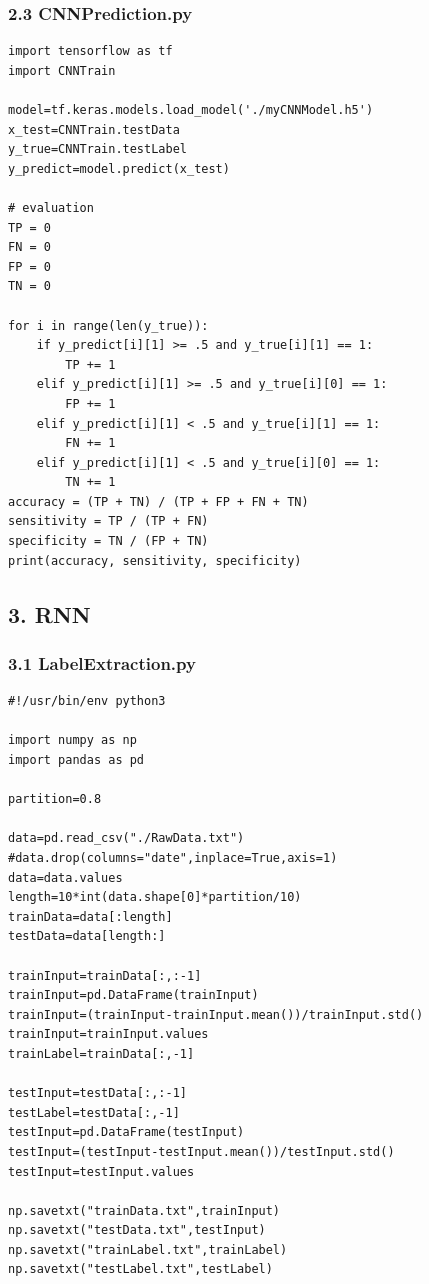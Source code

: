 \documentclass[12pt]{ctexart}
\begin{document}
\subsubsection*{2.3 CNNPrediction.py}
\begin{scriptsize}
\begin{verbatim}
import tensorflow as tf
import CNNTrain

model=tf.keras.models.load_model('./myCNNModel.h5')
x_test=CNNTrain.testData
y_true=CNNTrain.testLabel
y_predict=model.predict(x_test)

# evaluation
TP = 0
FN = 0
FP = 0
TN = 0

for i in range(len(y_true)):
    if y_predict[i][1] >= .5 and y_true[i][1] == 1:
        TP += 1
    elif y_predict[i][1] >= .5 and y_true[i][0] == 1:
        FP += 1
    elif y_predict[i][1] < .5 and y_true[i][1] == 1:
        FN += 1
    elif y_predict[i][1] < .5 and y_true[i][0] == 1:
        TN += 1
accuracy = (TP + TN) / (TP + FP + FN + TN)
sensitivity = TP / (TP + FN)
specificity = TN / (FP + TN)
print(accuracy, sensitivity, specificity)

\end{verbatim}
\end{scriptsize}
\subsection*{3. RNN}
\subsubsection*{3.1 LabelExtraction.py}
\begin{scriptsize}
\begin{verbatim}
#!/usr/bin/env python3

import numpy as np
import pandas as pd

partition=0.8

data=pd.read_csv("./RawData.txt")
#data.drop(columns="date",inplace=True,axis=1)
data=data.values
length=10*int(data.shape[0]*partition/10)
trainData=data[:length]
testData=data[length:]

trainInput=trainData[:,:-1]
trainInput=pd.DataFrame(trainInput)
trainInput=(trainInput-trainInput.mean())/trainInput.std()
trainInput=trainInput.values
trainLabel=trainData[:,-1]

testInput=testData[:,:-1]
testLabel=testData[:,-1]
testInput=pd.DataFrame(testInput)
testInput=(testInput-testInput.mean())/testInput.std()
testInput=testInput.values

np.savetxt("trainData.txt",trainInput)
np.savetxt("testData.txt",testInput)
np.savetxt("trainLabel.txt",trainLabel)
np.savetxt("testLabel.txt",testLabel)

\end{verbatim}
\end{scriptsize}
\end{document}
